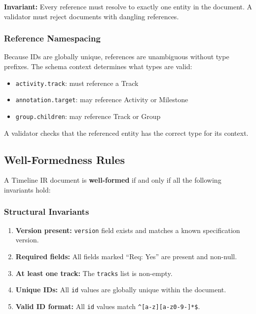 \textbf{Invariant:} Every reference must resolve to exactly one entity in the document.
A validator must reject documents with dangling references.

\subsubsection{Reference Namespacing}

Because IDs are globally unique, references are unambiguous without type prefixes.
The schema context determines what types are valid:

\begin{itemize}
  \item \texttt{activity.track}: must reference a Track
  \item \texttt{annotation.target}: may reference Activity or Milestone
  \item \texttt{group.children}: may reference Track or Group
\end{itemize}

A validator checks that the referenced entity has the correct type for its context.

\subsection{Well-Formedness Rules}
\label{sec:ir-invariants}

A Timeline IR document is \textbf{well-formed} if and only if all the following
invariants hold:

\subsubsection{Structural Invariants}

\begin{enumerate}
  \item \textbf{Version present:} \texttt{version} field exists and matches a known
        specification version.
  \item \textbf{Required fields:} All fields marked ``Req: Yes'' are present and non-null.
  \item \textbf{At least one track:} The \texttt{tracks} list is non-empty.
  \item \textbf{Unique IDs:} All \texttt{id} values are globally unique within the document.
  \item \textbf{Valid ID format:} All \texttt{id} values match \verb|^[a-z][a-z0-9-]*$|.
\end{enumerate}

